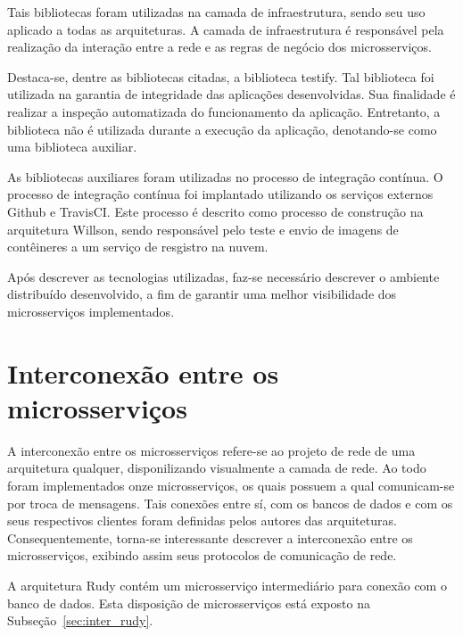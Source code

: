 Tais bibliotecas foram utilizadas na camada de infraestrutura, sendo seu uso aplicado a todas as arquiteturas.
%
A camada de infraestrutura é responsável pela realização da interação entre a rede e as regras de negócio dos microsserviços.


Destaca-se, dentre as bibliotecas citadas, a biblioteca testify.
%
Tal biblioteca foi utilizada na garantia de integridade das aplicações desenvolvidas.
%
Sua finalidade é realizar a inspeção automatizada do funcionamento da aplicação.
%
Entretanto, a biblioteca não é utilizada durante a execução da aplicação, denotando-se como uma biblioteca auxiliar.



As bibliotecas auxiliares foram utilizadas no processo de integração contínua.
%
O processo de integração contínua foi implantado utilizando os serviços externos Github e TravisCI.
%
Este processo é descrito como processo de construção na arquitetura Willson, sendo responsável pelo teste e envio de imagens de contêineres a um serviço de resgistro na nuvem.




Após descrever as tecnologias utilizadas, faz-se necessário descrever o ambiente distribuído desenvolvido, a fim de garantir uma melhor visibilidade dos microsserviços implementados.



\section{Interconexão entre os microsserviços}
\label{sec:interconexao}



A interconexão entre os microsserviços refere-se ao projeto de rede de uma arquitetura qualquer, disponilizando visualmente a camada de rede.
%
Ao todo foram implementados onze microsserviços, os quais possuem a qual comunicam-se por troca de mensagens.
%
Tais conexões entre sí, com os bancos de dados e com os seus respectivos clientes foram definidas pelos autores das arquiteturas.
%
Consequentemente, torna-se interessante descrever a interconexão entre os microsserviços, exibindo assim seus protocolos de comunicação de rede.



A arquitetura Rudy contém um microsserviço intermediário para conexão com o banco de dados.
%
Esta disposição de microsserviços está exposto na Subseção~\ref{sec:inter_rudy}.



